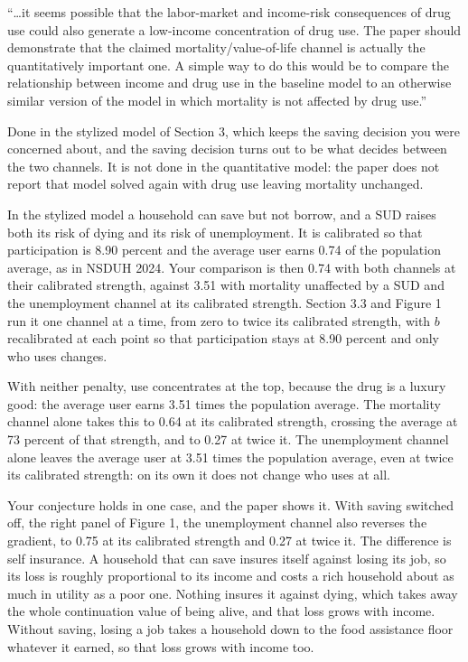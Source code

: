 \documentclass[11pt]{article}
\begin{document}
\begin{referee}
``\dots it seems possible that the labor-market and income-risk consequences of
drug use could also generate a low-income concentration of drug use. The paper
should demonstrate that the claimed mortality/value-of-life channel is actually
the quantitatively important one. A simple way to do this would be to compare the
relationship between income and drug use in the baseline model to an otherwise
similar version of the model in which mortality is not affected by drug use.''
\end{referee}
\begin{response}
\newresult Done in the stylized model of Section 3, which keeps the saving
decision you were concerned about, and the saving decision turns out to be what
decides between the two channels. \open It is not done in the quantitative
model: the paper does not report that model solved again with drug use leaving
mortality unchanged.

In the stylized model a household can save but not borrow, and a SUD raises both
its risk of dying and its risk of unemployment. It is calibrated so that
participation is 8.90 percent and the average user earns 0.74 of the population
average, as in NSDUH 2024. Your comparison is then 0.74 with both channels at
their calibrated strength, against 3.51 with mortality unaffected by a SUD and the
unemployment channel at its calibrated strength. Section 3.3 and Figure 1 run it
one channel at a time, from zero to twice its calibrated strength, with $b$
recalibrated at each point so that participation stays at 8.90 percent and only
who uses changes.

With neither penalty, use concentrates at the top, because the drug is a luxury
good: the average user earns 3.51 times the population average. The mortality
channel alone takes this to 0.64 at its calibrated strength, crossing the average
at 73 percent of that strength, and to 0.27 at twice it. The unemployment channel
alone leaves the average user at 3.51 times the population average, even at twice
its calibrated strength: on its own it does not change who uses at all.

Your conjecture holds in one case, and the paper shows it. With saving switched
off, the right panel of Figure 1, the unemployment channel also reverses the
gradient, to 0.75 at its calibrated strength and 0.27 at twice it. The
difference is self insurance. A household that can save insures itself against
losing its job, so its loss is roughly proportional to its income and costs a
rich household about as much in utility as a poor one. Nothing insures it against
dying, which takes away the whole continuation value of being alive, and that
loss grows with income. Without saving, losing a job takes a household down to
the food assistance floor whatever it earned, so that loss grows with income too.


\end{response}
\end{document}
